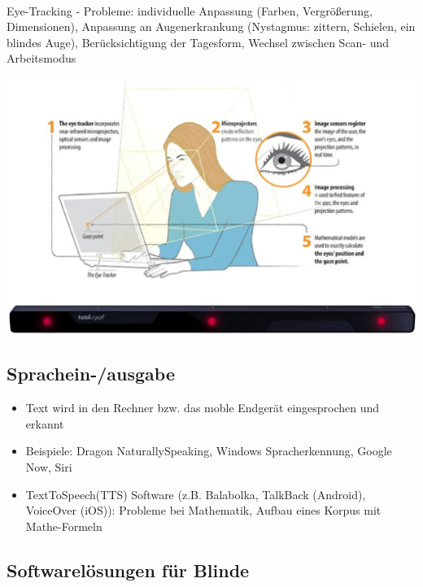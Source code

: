 \documentclass[paper=a4, fontsize=11pt]{scrartcl} %
\numberwithin{equation}{section} %
\numberwithin{figure}{section} %
\numberwithin{table}{section} %
\begin{document}
\begin{itemize}
\begin{minipage}[c]{0.35\textwidth}
\end{minipage}\\ 
\begin{minipage}[c]{0.55\textwidth}
\item Eye-Tracking - Probleme: individuelle Anpassung (Farben, Vergrößerung, Dimensionen), Anpassung an Augenerkrankung (Nystagmus: zittern, Schielen, ein blindes Auge), Berücksichtigung der Tagesform, Wechsel zwischen Scan- und Arbeitsmodus
\end{minipage}
\begin{minipage}[c]{0.35\textwidth}
\includegraphics[width=\textwidth]{imgs/eyetracking}
\end{minipage}
\end{itemize}

\subsection{Sprachein-/ausgabe}

\begin{itemize}
\item Text wird in den Rechner bzw. das moble Endgerät eingesprochen und erkannt
\item Beispiele: Dragon NaturallySpeaking, Windows Spracherkennung, Google Now, Siri
\item TextToSpeech(TTS) Software (z.B. Balabolka, TalkBack (Android), VoiceOver (iOS)): Probleme bei Mathematik, Aufbau eines Korpus mit Mathe-Formeln
\end{itemize}

\subsection{Softwarelösungen für Blinde}
\end{document}
